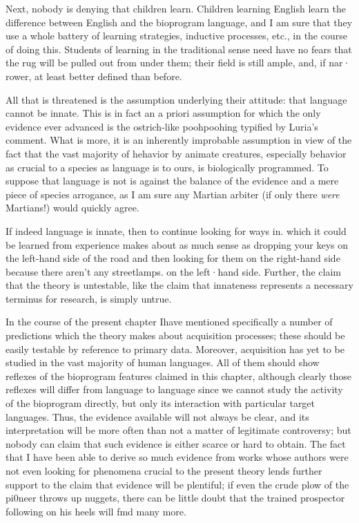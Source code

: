 Next, nobody is denying that children learn. Children learning English learn the difference between English and the bioprogram language, and I am sure that they use a whole battery of learning strategies, inductive processes, etc., in the course of doing this. Students of learning in the traditional sense need have no fears that the rug will be pulled out from under them; their field is still ample, and, if nar· rower, at least better defined than before.

All that is threatened is the assumption underlying their attitude: that language cannot be innate. This is in fact an a priori assumption for which the only evidence ever advanced is the ostrich-like pooh\-poohing typified by Luria's comment. What is more, it is an inherently improbable assumption in view of the fact that the vast majority of hehavior by animate creatures, especially behavior as crucial to a species as language is to ours, is biologically programmed. To suppose that language is not is against the balance of the evidence and a mere
piece of species arrogance, as I am sure any Martian arbiter (if only there \textit{were }Martians!) would quickly agree.

If indeed language is innate, then to continue looking for ways in. which it could be learned from experience makes about as much sense as dropping your keys on the left-hand side of the road and then looking for them on the right-hand side because there aren't any streetlamps. on the left·hand side. Further, the claim that the theory is untestable, like the claim that innateness represents a necessary terminus for research, is simply untrue.


In the course of the present chapter Ihave mentioned specifically a number of predictions which the theory makes about acquisition processes; these should be easily testable by reference to primary data. Moreover, acquisition has yet to be studied in the vast majority of human languages. All of them should show reflexes of the bioprogram features claimed in this chapter, although clearly those reflexes will differ from language to language since we cannot study the activity of the bioprogram directly, but only its interaction with particular target languages. Thus, the evidence available will not always be clear, and its interpretation will be more often than not a matter of legiti\-mate controversy; but nobody can claim that such evidence is either scarce or hard to obtain. The fact that I have been able to derive so much evidence from works whose authors were not even looking for phenomena crucial to the present theory lends further support to the claim that evidence will be plentiful; if even the crude plow of the pi0neer throws up nuggets, there can be little doubt that the trained prospector following on his heels will fmd many more.

